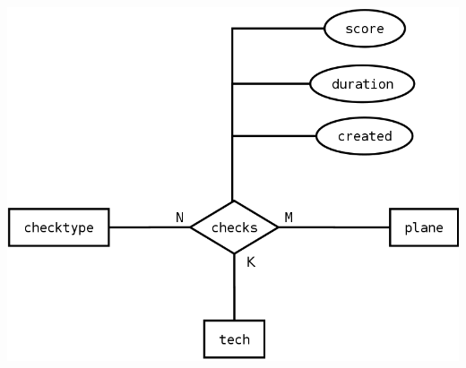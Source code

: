 \documentclass[11pt,a4paper]{article}
\begin{document}
\includegraphics[width=\textwidth]{../../ER_model/aviation_relations_2.png}\\
\end{document}
